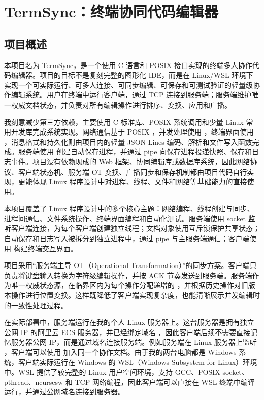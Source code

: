 ﻿\section{TermSync：终端协同代码编辑器}

\subsection{项目概述}

本项目名为 TermSync，是一个使用 C 语言和 POSIX 接口实现的终端多人协作代码编辑器。项目的目标不是复刻完整的图形化 IDE，而是在 Linux/WSL 环境下实现一个可实际运行、可多人连接、可同步编辑、可保存和可测试验证的轻量级协作编辑系统。用户在终端中运行客户端，通过 TCP 连接到服务端；服务端维护唯一权威文档状态，并负责对所有编辑操作进行排序、变换、应用和广播。

我刻意减少第三方依赖，主要使用 C 标准库、POSIX 系统调用和少量 Linux 常用开发库完成系统实现。网络通信基于 POSIX ，并发处理使用 ，终端界面使用 ，消息格式和持久化则由项目内的轻量 JSON Lines 编码、解析和文件写入函数完成。服务端使用  创建自动保存进程，并通过 pipe 向保存进程投递快照、保存和日志事件。项目没有依赖现成的 Web 框架、协同编辑库或数据库系统，因此网络协议、客户端状态机、服务端 OT 变换、广播同步和保存机制都由项目代码自行实现，更能体现 Linux 程序设计中对进程、线程、文件和网络等基础能力的直接使用。

本项目覆盖了 Linux 程序设计中的多个核心主题：网络编程、线程创建与同步、进程间通信、文件系统操作、终端界面编程和自动化测试。服务端使用 socket 监听客户端连接，为每个客户端创建独立线程；文档对象使用互斥锁保护共享状态；自动保存和日志写入被拆分到独立进程中，通过 pipe 与主服务端通信；客户端使用  构建终端交互界面。

项目采用“服务端主导 OT（Operational Transformation）”的同步方案。客户端只负责将键盘输入转换为字符级编辑操作，并按 ACK 节奏发送到服务端。服务端作为唯一权威状态源，在临界区内为每个操作分配递增的 ，并根据历史操作对旧版本操作进行位置变换。这样既降低了客户端实现复杂度，也能清晰展示并发编辑时的一致性处理过程。

在实际部署中，服务端运行在我的个人 Linux 服务器上。这台服务器是拥有独立公网 IP 的阿里云 ECS 服务器，并已经绑定域名 ，因此客户端后续不需要直接记忆服务器公网 IP，而是通过域名连接服务端。例如服务端在 Linux 服务器上监听 ，客户端可以使用  加入同一个协作文档。由于我的两台电脑都是 Windows 系统，客户端实际运行在 Windows 的 WSL（Windows Subsystem for Linux）环境中。WSL 提供了较完整的 Linux 用户空间环境，支持 GCC、POSIX socket、pthread、ncursesw 和 TCP 网络编程，因此客户端可以直接在 WSL 终端中编译运行，并通过公网域名连接到服务器。

